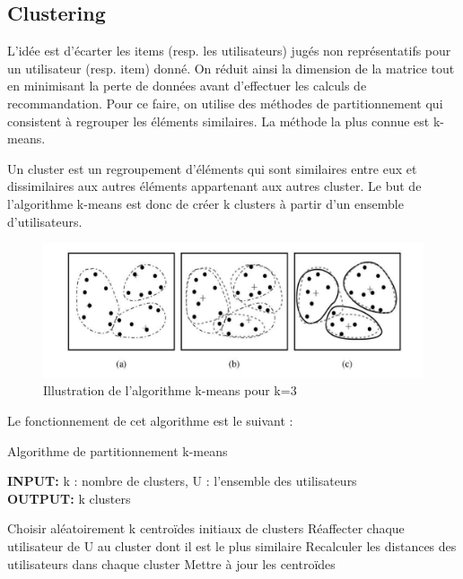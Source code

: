 \subsection{Clustering}
L’idée est d’écarter les items (resp. les utilisateurs) jugés non représentatifs pour un utilisateur (resp. item) donné. On réduit ainsi la dimension de la matrice tout en minimisant la perte de données avant d’effectuer les calculs de recommandation.
Pour ce faire, on utilise des méthodes de partitionnement qui consistent à regrouper les éléments similaires. La méthode la plus connue est k-means.\par
Un cluster est un regroupement d'éléments qui sont similaires entre eux et dissimilaires aux autres éléments appartenant aux autres cluster. Le but de l'algorithme k-means est donc de créer k clusters à partir d'un ensemble d'utilisateurs.

\begin{figure}[H]
	\begin{center}
		\includegraphics[scale=0.27]{img/k_means.png}
	\end{center}
	\caption{Illustration de l'algorithme k-means pour k=3}
\end{figure}

Le fonctionnement de cet algorithme est le suivant :
\begin{algorithm}
\caption{Algorithme de partitionnement k-means}
\textbf{INPUT:} k : nombre de clusters, U : l'ensemble des utilisateurs\\
\textbf{OUTPUT:} k clusters
\begin{algorithmic}
\STATE Choisir aléatoirement k centroïdes initiaux de clusters
\REPEAT
\STATE Réaffecter chaque utilisateur de U au cluster dont il est le plus similaire
\STATE Recalculer les distances des utilisateurs dans chaque cluster
\STATE Mettre à jour les centroïdes
\end{algorithmic}
\end{algorithm}

